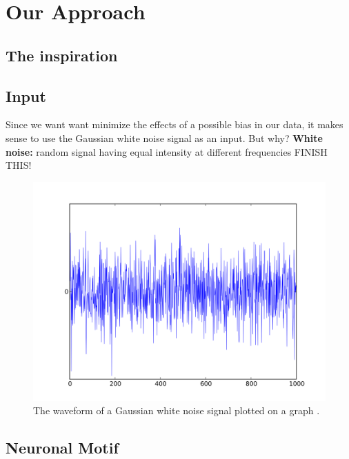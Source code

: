 \documentclass[../../Orator]{subfiles}
\begin{document}
\section{Our Approach}

\subsection{The inspiration}

\subsection{Input}
\indent Since we want want minimize the effects of a possible bias in our data, it makes sense to use the Gaussian white noise signal as an input. But why? \newline
\indent \textbf{White noise:} random signal having equal intensity at different frequencies 
FINISH THIS!
\begin{figure}[h]
    \centering
    \includegraphics[width=300 pt]{Pictures/Ana/White_noise.svg.png}
    \caption{The waveform of a Gaussian white noise signal plotted on a graph \cite{}.} \label{fig:HH circuit}
\end{figure}
\subsection{Neuronal Motif}
\end{document}
